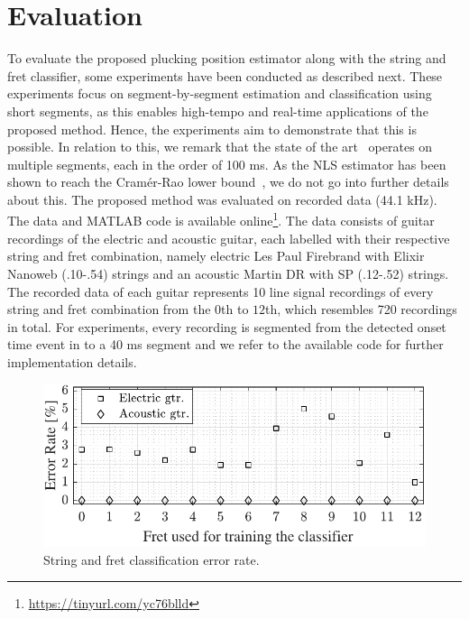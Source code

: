 \documentclass{article}
\begin{document}
\section{Evaluation} %
\label{sec:experiments}
To evaluate the proposed plucking position estimator along with the string and fret classifier, some experiments have been conducted as described next. These experiments focus on segment-by-segment estimation and classification using short segments, as this enables high-tempo and real-time applications of the proposed method. Hence, the experiments aim to demonstrate that this is possible. In relation to this, we remark that the state of the art~\cite{barbancho:inharmonicity_tablature,michelson2018_aes} operates on multiple segments, each in the order of 100 ms. As the NLS estimator has been shown to reach the Cram{\'e}r-Rao lower bound~\cite{nielsen2017fast}, we do not go into further details about this. The proposed method was evaluated on recorded data (44.1 kHz). The data and MATLAB code is available online\footnote{\url{https://tinyurl.com/yc76blld}}. The data consists of guitar recordings of the electric and acoustic guitar, each labelled with their respective string and fret combination, namely electric Les Paul Firebrand with Elixir Nanoweb (.10-.54) strings and an acoustic Martin DR with SP (.12-.52) strings. The recorded data of each guitar represents 10 line signal recordings of every string and fret combination from the $0$th to $12$th, which resembles 720 recordings in total. For experiments, every recording is segmented from the detected onset time event in to a 40 ms segment and we refer to the available code for further implementation details. %
\begin{figure}[t]
  \centering %
  \centerline{\includegraphics[width=.9\columnwidth]{img/errorRate_vs_frets2.pdf}}%
  \caption{String and fret classification error rate.}\label{fig:err_vs_frets}
\end{figure}%
\end{document}
